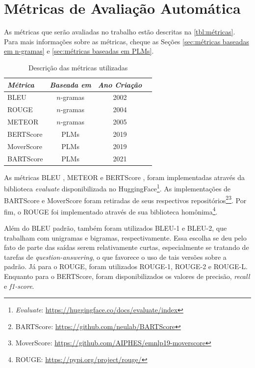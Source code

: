 \documentclass[cic,tc]{iiufrgs}
\begin{document}
\section{Métricas de Avaliação Automática}
\label{sec:métricas-metodologia}
As métricas que serão avaliadas no trabalho estão descritas na \autoref{tbl:métricas}. Para mais informações sobre as métricas, cheque as Seções \ref{sec:métricas baseadas em n-gramas} e \ref{sec:métricas baseadas em PLMs}.

\begin{table}[htbp]
    \caption{Descrição das métricas utilizadas}
    \centering
        \begin{tabular}{l c c c}
          \hline
          \textit{Métrica}  &   \textit{Baseada em}  &     \textit{Ano Criação} \\
          \hline
          \hline
          BLEU       & $n$-gramas & 2002 \\
          ROUGE      & $n$-gramas & 2004 \\
          METEOR     & $n$-gramas & 2005 \\
          BERTScore  & PLMs       & 2019 \\
          MoverScore & PLMs       & 2019 \\
          BARTScore  & PLMs       & 2021 \\
          \hline
        \end{tabular}
    \label{tbl:métricas}
\end{table}

As métricas BLEU \cite{papineni2002bleu}, METEOR \cite{banerjee2005meteor} e BERTScore \cite{bert-score}, foram implementadas através da biblioteca \textit{evaluate} disponibilizada no HuggingFace\footnote{\textit{Evaluate}: \url{https://huggingface.co/docs/evaluate/index}}. As implementações de BARTScore \cite{yuan2021bartscore} e MoverScore \cite{zhao2019moverscore} foram retiradas de seus respectivos repositórios\footnote{BARTScore: \url{https://github.com/neulab/BARTScore}}\footnote{MoverScore: \url{https://github.com/AIPHES/emnlp19-moverscore}}. Por fim, o ROUGE \cite{lin2004rouge} foi implementado através de sua biblioteca homônima\footnote{ROUGE: \url{https://pypi.org/project/rouge/}}.

Além do BLEU padrão, também foram utilizados BLEU-1 e BLEU-2, que trabalham com unigramas e bigramas, respectivamente. Essa escolha se deu pelo fato de parte das saídas serem relativamente curtas, especialmente se tratando de tarefas de \textit{question-answering}, o que favorece o uso de tais versões sobre a padrão. Já para o ROUGE, foram utilizados ROUGE-1, ROUGE-2 e ROUGE-L. Enquanto para o BERTScore, foram disponibilizados os valores de precisão, \textit{recall} e \textit{f1-score}.
\end{document}
